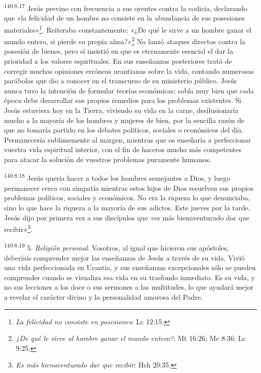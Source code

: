 \par
\textsuperscript{140:8.17} Jesús previno con frecuencia a sus oyentes contra la codicia, declarando que «la felicidad de un hombre no consiste en la abundancia de sus posesiones materiales»\footnote{\textit{La felicidad no consiste en posesiones}: Lc 12:15.}. Reiteraba constantemente: «¿De qué le sirve a un hombre ganar el mundo entero, si pierde su propia alma?»\footnote{\textit{¿De qué le sirve al hombre ganar el mundo entero?}: Mt 16:26; Mc 8:36; Lc 9:25.} No lanzó ataques directos contra la posesión de bienes, pero sí insistió en que es eternamente esencial el dar la prioridad a los valores espirituales. En sus enseñanzas posteriores trató de corregir muchas opiniones erróneas urantianas sobre la vida, contando numerosas parábolas que dio a conocer en el transcurso de su ministerio público. Jesús nunca tuvo la intención de formular teorías económicas; sabía muy bien que cada época debe desarrollar sus propios remedios para los problemas existentes. Si Jesús estuviera hoy en la Tierra, viviendo su vida en la carne, desilusionaría mucho a la mayoría de los hombres y mujeres de bien, por la sencilla razón de que no tomaría partido en los debates políticos, sociales o económicos del día. Permanecería sublimemente al margen, mientras que os enseñaría a perfeccionar vuestra vida espiritual interior, con el fin de haceros mucho más competentes para atacar la solución de vuestros problemas puramente humanos.

\par
\textsuperscript{140:8.18} Jesús quería hacer a todos los hombres semejantes a Dios, y luego permanecer cerca con simpatía mientras estos hijos de Dios resuelven sus propios problemas políticos, sociales y económicos. No era la riqueza lo que denunciaba, sino lo que hace la riqueza a la mayoría de sus adictos. Este jueves por la tarde, Jesús dijo por primera vez a sus discípulos que «es más bienaventurado dar que recibir»\footnote{\textit{Es más bienaventurado dar que recibir}: Hch 20:35.}.

\par
\textsuperscript{140:8.19} 5. \textit{Religión personal}. Vosotros, al igual que hicieron sus apóstoles, deberíais comprender mejor las enseñanzas de Jesús a través de su vida. Vivió una vida perfeccionada en Urantia, y sus enseñanzas excepcionales sólo se pueden comprender cuando se visualiza esa vida en su trasfondo inmediato. Es su vida, y no sus lecciones a los doce o sus sermones a las multitudes, lo que ayudará mejor a revelar el carácter divino y la personalidad amorosa del Padre.

